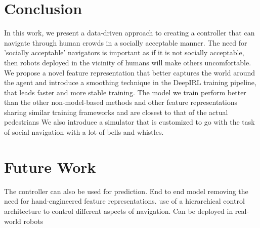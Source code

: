 
\section{Conclusion}
In this work, we present a data-driven approach to creating a controller that can navigate through human crowds in a socially acceptable manner. The need for 'socially acceptable' navigators is important as if it is not socially acceptable, then robots deployed in the vicinity of humans will make others uncomfortable. 
We propose a novel feature representation that better captures the world around the agent and introduce a smoothing technique in the DeepIRL training pipeline, that leads faster and more stable training. 
The model we train perform better than the other non-model-based methods and other feature representations sharing similar training frameworks and are closest to that of the actual pedestrians 
We also introduce a simulator that is customized to go with the task of social navigation with a lot of bells and whistles. 

\section{Future Work}
The controller can also be used for prediction.
End to end model removing the need for hand-engineered feature representations.
use of a hierarchical control architecture to control different aspects of navigation.
Can be deployed in real-world robots